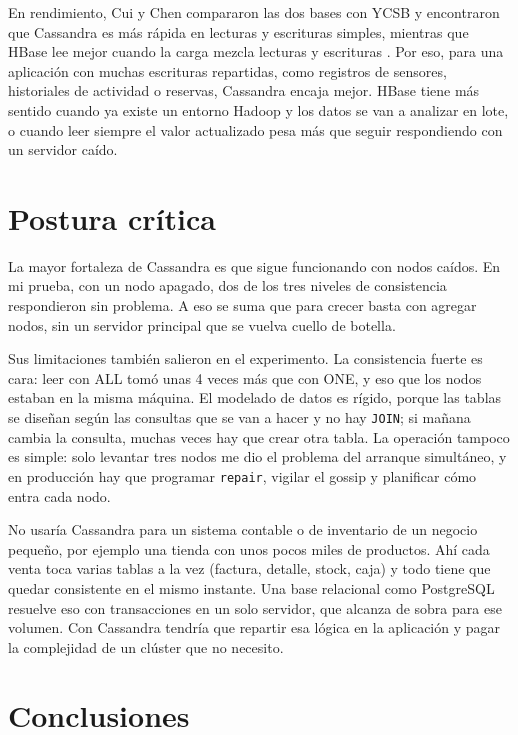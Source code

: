 \documentclass[12pt,a4paper]{article}
\begin{document}
En rendimiento, Cui y Chen compararon las dos bases con YCSB y encontraron que Cassandra es más rápida en lecturas y escrituras simples, mientras que HBase lee mejor cuando la carga mezcla lecturas y escrituras \cite{cui2021performance}. Por eso, para una aplicación con muchas escrituras repartidas, como registros de sensores, historiales de actividad o reservas, Cassandra encaja mejor. HBase tiene más sentido cuando ya existe un entorno Hadoop y los datos se van a analizar en lote, o cuando leer siempre el valor actualizado pesa más que seguir respondiendo con un servidor caído.
\newpage
\section{Postura crítica}

La mayor fortaleza de Cassandra es que sigue funcionando con nodos caídos. En mi prueba, con un nodo apagado, dos de los tres niveles de consistencia respondieron sin problema. A eso se suma que para crecer basta con agregar nodos, sin un servidor principal que se vuelva cuello de botella.

Sus limitaciones también salieron en el experimento. La consistencia fuerte es cara: leer con ALL tomó unas 4 veces más que con ONE, y eso que los nodos estaban en la misma máquina. El modelado de datos es rígido, porque las tablas se diseñan según las consultas que se van a hacer y no hay \texttt{JOIN}; si mañana cambia la consulta, muchas veces hay que crear otra tabla. La operación tampoco es simple: solo levantar tres nodos me dio el problema del arranque simultáneo, y en producción hay que programar \texttt{repair}, vigilar el gossip y planificar cómo entra cada nodo.

No usaría Cassandra para un sistema contable o de inventario de un negocio pequeño, por ejemplo una tienda con unos pocos miles de productos. Ahí cada venta toca varias tablas a la vez (factura, detalle, stock, caja) y todo tiene que quedar consistente en el mismo instante. Una base relacional como PostgreSQL resuelve eso con transacciones en un solo servidor, que alcanza de sobra para ese volumen. Con Cassandra tendría que repartir esa lógica en la aplicación y pagar la complejidad de un clúster que no necesito.

\section{Conclusiones}
\end{document}
